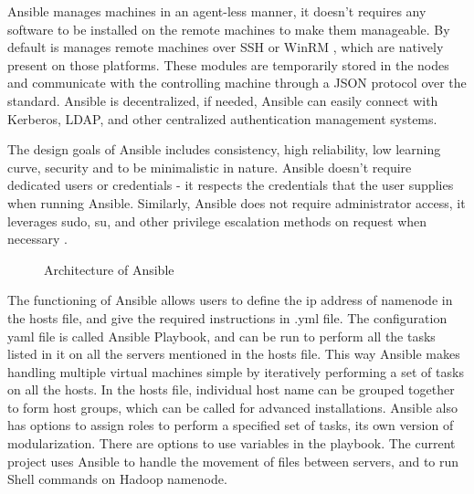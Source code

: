 \documentclass[9pt,twocolumn,twoside]{../../styles/osajnl}
\begin{document}
Ansible manages machines in an agent-less manner, it doesn't requires any software to be installed on the remote machines to make them manageable. By default is manages remote machines over SSH or WinRM \cite{www-ansible}, which are natively present on those platforms. These modules are temporarily stored in the nodes and communicate with the controlling machine through a JSON protocol over the standard. Ansible is decentralized, if needed, Ansible can easily connect with Kerberos, LDAP, and other centralized authentication management systems.




The design goals of Ansible includes consistency, high reliability, low learning curve, security and to be minimalistic in nature. Ansible doesn't require dedicated users or credentials - it respects the credentials that the user supplies when running Ansible. Similarly, Ansible does not require administrator access, it leverages sudo, su, and other privilege escalation methods on request when necessary \cite{git-ansible}.

\begin{figure}[htbp]
\centering
{}
\caption{Architecture of Ansible \cite{www-ansible-fig}}
\label{fig:ansible}
\end{figure}


The functioning of Ansible allows users to define the ip address of namenode in the hosts file, and give the required instructions in .yml file. The configuration yaml file is called Ansible Playbook, and can be run to perform all the tasks listed in it on all the servers mentioned in the hosts file. This way Ansible makes handling multiple virtual machines simple by iteratively performing a set of tasks on all the hosts. In the hosts file, individual host name can be grouped together to form host groups, which can be called for advanced installations. Ansible also has options to assign roles to perform a specified set of tasks, its own version of modularization. There are options to use variables in the playbook. The current project uses Ansible to handle the movement of files between servers, and to run Shell commands on Hadoop namenode. 
\end{document}
